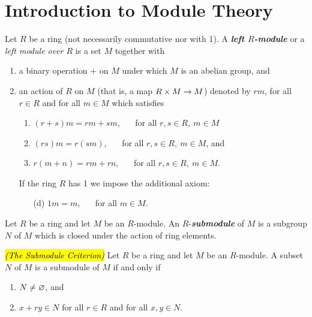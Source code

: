 \section{Introduction to Module Theory}
\setcounter{thm}{0}

\begin{defn}
Let $R$ be a ring (not necessarily commutative nor with 1). A \textit{\textbf{left $R$-module}} or a \textit{left module over $R$} is a set $M$ together with
\begin{enumerate}
\item a binary operation $+$ on $M$ under which $M$ is an abelian group, and
\item an action of $R$ on $M$ (that is, a map $R\times M\rightarrow M$) denoted by $rm$, for all $r\in R$ and for all $m\in M$ which satisfies
\begin{enumerate}
\item $(r + s)m = rm + sm$, \ \ \ for all $r,s\in R,\ m\in M$
\item $(rs)m = r(sm)$, \ \ \ for all $r,s\in R,\ m\in M$, and 
\item $r(m + n) = rm + rn$, \ \ \ for all $r,s\in R,\ m\in M$.
\end{enumerate}
If the ring $R$ has 1 we impose the additional axiom:
\begin{enumerate}
\item[(d)]  $1m = m$, \ \ \ for all $m\in M$.
\end{enumerate}
\end{enumerate}
\end{defn}

\nl

\begin{defn}
Let $R$ be a ring and let $M$ be an $R$-module. An $R$-\textit{\textbf{submodule}} of $M$ is a subgroup $N$ of $M$ which is closed under the action of ring elements. 
\end{defn}

\nl

\begin{prop}
\hl{\textit{(The Submodule Criterion)}} Let $R$ be a ring and let $M$ be an $R$-module. A subset $N$ of $M$ is a submodule of $M$ if and only if
\begin{enumerate}
\item $N\neq \varnothing$, and
\item $x + ry\in N$ for all $r\in R$ and for all $x,y\in N$.
\end{enumerate}
\end{prop}

